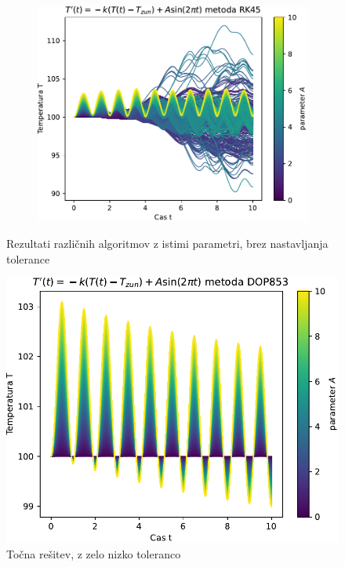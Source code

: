 \begin{figure}[h]
\begin{subfigure}[b]{0.45\textwidth}
    \end{subfigure}
    \hfill
    \begin{subfigure}[b]{0.45\textwidth}
        \includegraphics[width=\textwidth]{pdfs/A_RK45.pdf}
    \end{subfigure}
    \caption{Rezultati različnih algoritmov z istimi parametri, brez nastavljanja tolerance}
\end{figure}

\newpage
\begin{figure}[h]{}
    \centering
    \includegraphics[width=12cm]{pdfs/A_tocna.pdf}
    \caption{Točna rešitev, z zelo nizko toleranco}
\end{figure}
\newpage
